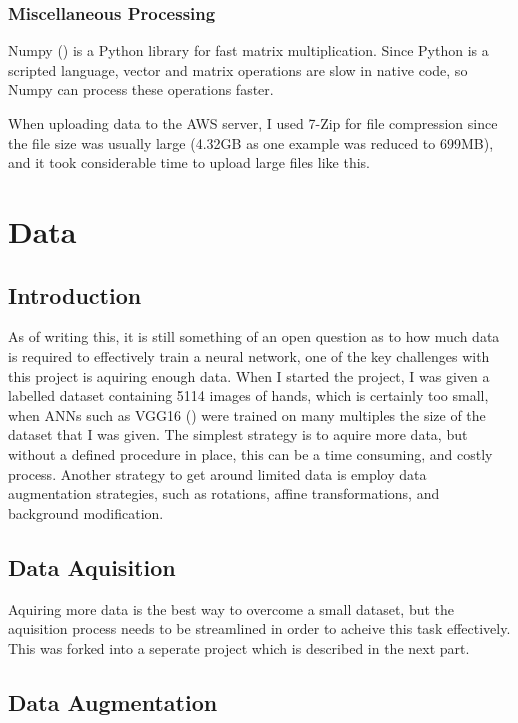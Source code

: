         \subsubsection{Miscellaneous Processing}
        Numpy (\cite{5725236}) is a Python library for fast matrix multiplication. Since Python is a scripted language, vector and matrix operations are slow in native code, so Numpy can process these operations faster.

        When uploading data to the AWS server, I used 7-Zip for file compression since the file size was usually large (4.32GB as one example was reduced to 699MB), and it took considerable time to upload large files like this.


\section{Data}
    \subsection{Introduction}
    As of writing this, it is still something of an open question as to how much data is required to effectively train a neural network, one of the key challenges with this project is aquiring enough data. When I started the project, I was given a labelled dataset containing 5114 images of hands, which is certainly too small, when ANNs such as VGG16 (\cite{vggnet}) were trained on many multiples the size of the dataset that I was given. The simplest strategy is to aquire more data, but without a defined procedure in place, this can be a time consuming, and costly process. Another strategy to get around limited data is employ data augmentation strategies, such as rotations, affine transformations, and background modification.

    \subsection{Data Aquisition}
    Aquiring more data is the best way to overcome a small dataset, but the aquisition process needs to be streamlined in order to acheive this task effectively. This was forked into a seperate project which is described in the next part.

    \subsection{Data Augmentation}
